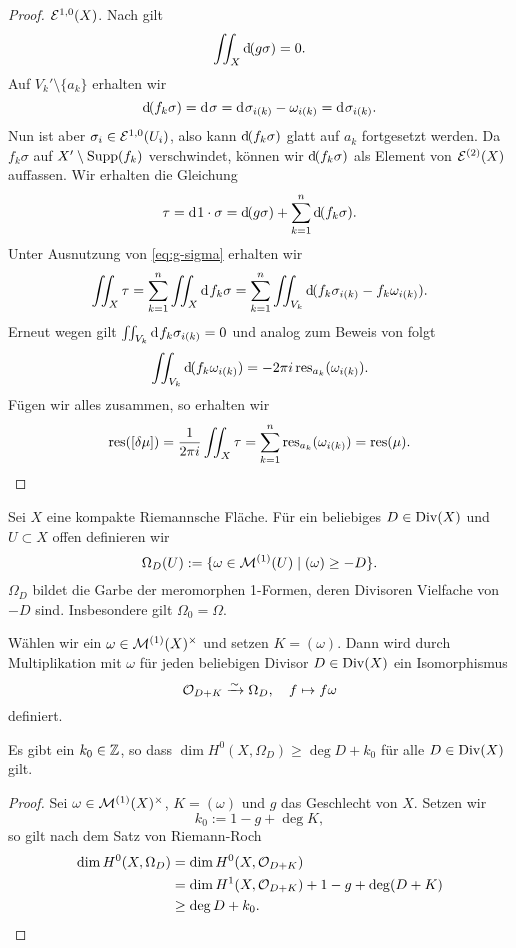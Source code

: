 \begin{proof}
  $\mathcal{E}^{1,0}(X)$. Nach \cite[Satz 10.20]{For} gilt
  \begin{align}
  \iint_X \d[(g \sigma)] = 0. \label{eq:g-sigma}
  \end{align}
  Auf $V_k' \setminus \{a_k\}$ erhalten wir
  \[
  \d[(f_k \sigma)] = \d[\sigma] = \d[\sigma_{i(k)} - \omega_{i(k)}] =
  \d[\sigma_{i(k)}].
  \]
  Nun ist aber $\sigma_i \in \mathcal{E}^{1,0}(U_i)$, also kann $\d[(f_k
  \sigma)]$ glatt auf $a_k$ fortgesetzt werden. Da $f_k\sigma$ auf $X'
  \setminus \operatorname{Supp}(f_k)$ verschwindet, können wir $\d[(f_k \sigma)]$
  als Element von $\mathcal{E}^{(2)}(X)$ auffassen. Wir erhalten die
  Gleichung
  \[
  \tau = \d[1 \cdot \sigma] = \d[(g\sigma)] + \sum_{k=1}^n \d[(f_k
  \sigma)].
  \]
  Unter Ausnutzung von \eqref{eq:g-sigma} erhalten wir
  \[
  \iint_X \tau = \sum_{k=1}^n \iint_X \d[f_k \sigma] = \sum_{k=1}^n
  \iint_{V_k} \d[(f_k\sigma_{i(k)} - f_k \omega_{i(k)} )].
  \]
  Erneut wegen \cite[Satz 10.20]{For} gilt $\iint_{V_k} \d[f_k \sigma_{i(k)}] = 0$ und
  analog zum Beweis von \break\cite[Satz 10.21]{For} folgt
  \[
  \iint_{V_k} \d[(f_k \omega_{i(k)})] = - 2\pi i
  \res_{a_k}(\omega_{i(k)}).
  \]
  Fügen wir alles zusammen, so erhalten wir
  \[
  \operatorname{res}([\delta \mu]) = \frac{1}{2\pi i} \iint_X \tau = \sum_{k=1}^n
  \operatorname{res}_{a_k}(\omega_{i(k)}) = \operatorname{res}(\mu).
  \]
\end{proof}

\begin{defin}
  \label{def:garbe-div}
  Sei $X$ eine kompakte Riemannsche Fläche. Für ein beliebiges $D \in
  \operatorname{Div}(X)$ und $U \subset X$ offen definieren wir
  \[
  \Omega_D(U) := \{ \omega \in \mathcal{M}^{(1)}(U) \mid (\omega) \geq -D \}.
  \]
  $\Omega_D$ bildet die Garbe der meromorphen 1-Formen, deren
  Divisoren Vielfache von $-D$ sind. Insbesondere gilt $\Omega_0 = \Omega$.

  Wählen wir ein $\omega \in \mathcal{M}^{(1)}(X)^\times$ und setzen $K =
  (\omega)$. Dann wird durch Multiplikation mit $\omega$ für jeden
  beliebigen Divisor $D \in \operatorname{Div}(X)$ ein Isomorphismus
  \[
  \mathcal{O}_{D+K} \xrightarrow{\sim} \Omega_D, \quad f \mapsto f \omega
  \]
  definiert.
\end{defin}


\begin{lemma}
  \label{lemma:k0}
  Es gibt ein $k_0 \in \mathbb{Z}$, so dass $\dim H^0(X, \Omega_D) \geq \deg D
  + k_0$ für alle $D \in \operatorname{Div}(X)$ gilt.
\end{lemma}

\begin{proof}
  Sei $\omega \in \mathcal{M}^{(1)}(X)^\times$, $K = (\omega)$ und $g$ das
  Geschlecht von $X$. Setzen wir
  \[
  k_0 := 1 - g + \deg K,
  \]
  so gilt nach dem Satz von Riemann-Roch
  \begin{align*}
    \dim H^0(X, \Omega_D) & = \dim H^0(X, \mathcal{O}_{D+K}) \\
    & = \dim H^1(X, \mathcal{O}_{D+K}) + 1 - g + \deg(D+K) \\
    & \geq \deg D + k_0.
  \end{align*}
\end{proof}

